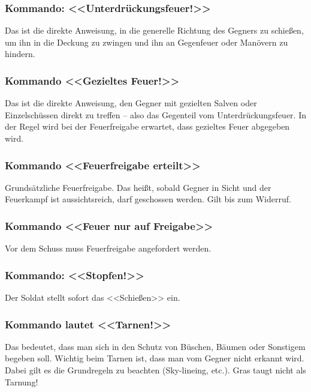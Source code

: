 \subsubsection{Kommando: <<Unterdrückungsfeuer!>>}

	Das ist die direkte Anweisung, in die generelle Richtung des Gegners zu schießen, um ihn in die Deckung zu zwingen und ihn an Gegenfeuer oder Manövern zu hindern. \\

\subsubsection{Kommando <<Gezieltes Feuer!>>}

	Das ist die direkte Anweisung, den Gegner mit gezielten Salven oder Einzelschüssen direkt zu treffen – also das Gegenteil vom Unterdrückungsfeuer. In der Regel wird bei der Feuerfreigabe erwartet, dass gezieltes Feuer abgegeben wird. \\

\subsubsection{Kommando <<Feuerfreigabe erteilt>>}
	Grundsätzliche Feuerfreigabe. Das heißt, sobald Gegner in Sicht und der Feuerkampf ist aussichtsreich, darf geschossen werden. Gilt bis zum Widerruf. \\

\subsubsection{Kommando <<Feuer nur auf Freigabe>>}
	Vor dem Schuss muss Feuerfreigabe angefordert werden. \\

\subsubsection{Kommando: <<Stopfen!>>}
	Der Soldat stellt sofort das <<Schießen>> ein. \\

\subsubsection{Kommando lautet <<Tarnen!>>}

	Das bedeutet, dass man sich in den Schutz von Büschen, Bäumen oder Sonstigem begeben soll. Wichtig beim Tarnen ist, dass man vom Gegner nicht erkannt wird. Dabei gilt es die Grundregeln zu beachten (Sky-lineing, etc.). Gras taugt nicht als Tarnung! \\

